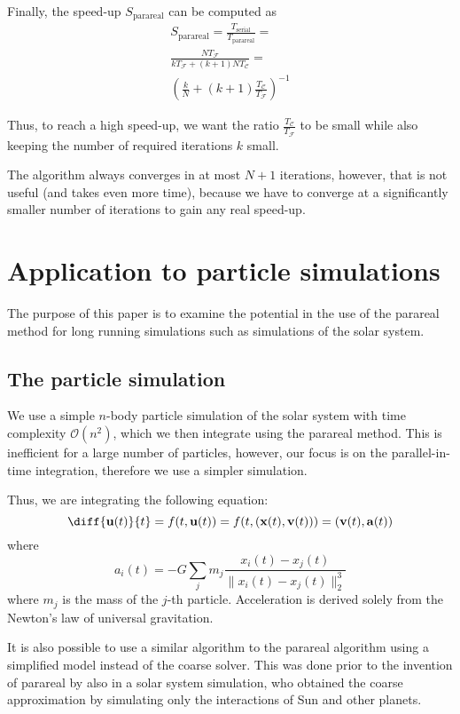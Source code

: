 \documentclass[conference]{IEEEtran}
\begin{document}
Finally, the speed-up $S_\text{parareal}$ can be computed as
\begin{multline}
S_\text{parareal} = \frac{T_\text{serial}}{T_\text{parareal}} = \\\frac{NT_\mathcal{F}}{kT_\mathcal{F} + (k+1)NT_\mathcal{C}} = \\\left(\frac{k}{N} + (k+1)\frac{T_\mathcal{C}}{T_\mathcal{F}}\right)^{-1}
\end{multline}

Thus, to reach a high speed-up, we want the ratio $\frac{T_\mathcal{C}}{T_\mathcal{F}}$ to be small while also keeping the number of required iterations $k$ small.\cite{speedup}

The algorithm always converges in at most $N+1$ iterations, however, that is not useful (and takes even more time), because we have to converge at a significantly smaller number of iterations to gain any real speed-up.\cite{speedup}

\section{Application to particle simulations}
The purpose of this paper is to examine the potential in the use of the parareal method for long running simulations such as simulations of the solar system. 

\subsection{The particle simulation}
We use a simple $n$-body particle simulation of the solar system with time complexity $\mathcal{O}(n^2)$, which we then integrate using the parareal method. This is inefficient for a large number of particles, however, our focus is on the parallel-in-time integration, therefore we use a simpler simulation.

Thus, we are integrating the following equation:
$$
\diff{\mathbf{u}(t)}{t} = f(t, \mathbf{u}(t)) = f(t, (\mathbf{x}(t), \mathbf{v}(t))) = (\mathbf{v}(t), \mathbf{a}(t))
$$
where 
$$
a_i(t) = -G \sum_j m_j\frac{x_i(t)-x_j(t)}{\|x_i(t)-x_j(t)\|_2^3}
$$
where $m_j$ is the mass of the $j$-th particle. Acceleration is derived solely from the Newton's law of universal gravitation.

It is also possible to use a similar algorithm to the parareal algorithm using a simplified model instead of the coarse solver. This was done prior to the invention of parareal by \cite{parallelsolar} also in a solar system simulation, who obtained the coarse approximation by simulating only the interactions of Sun and other planets.\cite{parallelsolar}\cite{farfuture}
\end{document}

